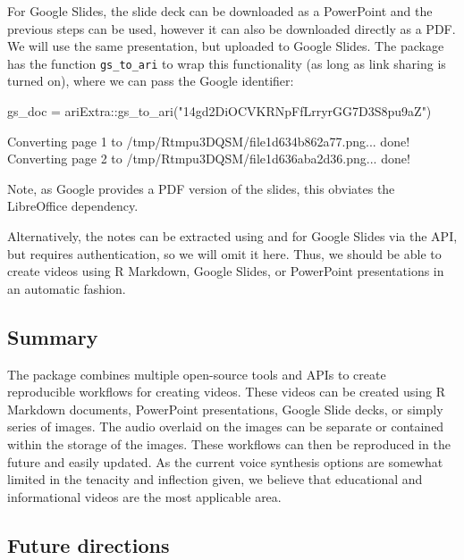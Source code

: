 For Google Slides, the slide deck can be downloaded as a PowerPoint and
the previous steps can be used, however it can also be downloaded
directly as a PDF. We will use the same presentation, but uploaded to
Google Slides. The  package has the function
\texttt{gs\_to\_ari} to wrap this functionality (as long as link sharing
is turned on), where we can pass the Google identifier:

\begin{Schunk}
\begin{Sinput}
gs_doc = ariExtra::gs_to_ari("14gd2DiOCVKRNpFfLrryrGG7D3S8pu9aZ")
\end{Sinput}
\begin{Soutput}
Converting page 1 to /tmp/Rtmpu3DQSM/file1d634b862a77.png... done!
Converting page 2 to /tmp/Rtmpu3DQSM/file1d636aba2d36.png... done!
\end{Soutput}
\end{Schunk}

Note, as Google provides a PDF version of the slides, this obviates the
LibreOffice dependency.

Alternatively, the notes can be extracted using  and
for Google Slides via the API, but requires authentication, so we will
omit it here. Thus, we should be able to create videos using R Markdown,
Google Slides, or PowerPoint presentations in an automatic fashion.

\hypertarget{summary}{%
\subsection{Summary}\label{summary}}

The  package combines multiple open-source tools and APIs to
create reproducible workflows for creating videos. These videos can be
created using R Markdown documents, PowerPoint presentations, Google
Slide decks, or simply series of images. The audio overlaid on the
images can be separate or contained within the storage of the images.
These workflows can then be reproduced in the future and easily updated.
As the current voice synthesis options are somewhat limited in the
tenacity and inflection given, we believe that educational and
informational videos are the most applicable area.

\hypertarget{future-directions}{%
\subsection{Future directions}\label{future-directions}}

